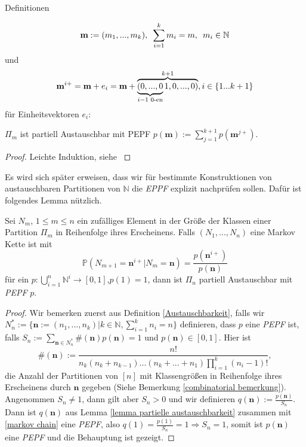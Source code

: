 \begin{section}{Definitionen}
\begin{lemma}
    \[
    \textbf{m} := (m_1,...,m_k), \hspace*{5pt} \sum_{i=1}^{k}m_i = m,\hspace*{5pt} m_i \in \mathbb{N} 
    \]
    und 
    \[ 
    \textbf{m}^{i+} = \textbf{m} + e_i =\textbf{m} + \overbrace{\underbrace{(0,...,0}_{i-1 \textnormal{ 0-en}}1,0,...,0)}^{k+1} , i \in \{1...k+1\}
    \]
     für Einheitsvektoren $e_i$:
\begin{center} 
    $\Pi_m$ ist partiell Austauschbar mit PEPF $p(\textbf{m}):=  \sum_{j=1}^{k+1} p(\textbf{m}^{j+})$.
\end{center}
\end{lemma}
\begin{proof}
    Leichte Induktion, siehe \cite[Proposition 10]{pitman1995exchangeable}
\end{proof}
\begin{Bemerkung}
    Es wird sich später erweisen, dass wir für bestimmte Konstruktionen von austauschbaren Partitionen von $\mathbb{N}$ die \textit{EPPF} explizit nachprüfen sollen. Dafür ist folgendes Lemma nützlich.
\end{Bemerkung}
\begin{lemma}
    \label{Austauschbar Lemma}
    Sei $N_m$, $1 \leq m \leq n$ ein zufälliges Element in der Größe der Klassen einer Partition $\Pi_m$ in Reihenfolge ihres Erscheinens. Falls $(N_1,...,N_n)$ eine Markov Kette ist mit 
    \begin{equation}
    \label{markov chain}
    \mathbb{P}(N_{m+1} = \textbf{n}^{i+} | N_{m} = \textbf{n}) = \frac{p(\textbf{n}^{i+})}{p(\textbf{n})} 
    \end{equation}
   für ein $p: \bigcup_{i = 1}^{n}\mathbb{N}^i \rightarrow [0,1]$,$p(1) = 1$, dann ist $\Pi_n$ partiell Austauschbar mit \textit{PEPF} $p$.
\end{lemma}
\begin{proof}
    Wir bemerken zuerst aus Definition \ref{Austauschbarkeit}, falls wir $N^*_n:= \{\textbf{n}:= (n_1,...,n_k)|k \in \mathbb{N},\sum_{i=1}^{k}n_i = n\}$ definieren, dass $p$ eine \textit{PEPF} ist, falls $S_n := \sum_{\textbf{n} \in N^*_n}\#(\textbf{n})p(\textbf{n}) = 1$ und $p(\textbf{n}) \in [0,1]$. Hier ist 
    \begin{equation}
        \label{combinatorial equation}
        \#(\textbf{n}):= \frac{n!}{n_k(n_k + n_{k-1})...(n_k+...+n_1)\prod_{i=1}^{k}(n_i-1)!},
    \end{equation}
    die Anzahl der Partitionen von $[n]$ mit Klassengrößen in Reihenfolge ihres Erscheinens durch $\textbf{n}$ gegeben (Siehe Bemerkung \ref{combinatorial bemerkung}). Angenommen $S_n \neq 1$, dann gilt aber $S_n> 0$ und wir definieren $q(\textbf{n}) := \frac{p(\textbf{n})}{S_n}$. Dann ist $q(\textbf{n})$ aus Lemma \ref{lemma partielle austauschbarkeit} zusammen mit \ref{markov chain} eine \textit{PEPF}, also $q(1) = \frac{p(1)}{S_n} = 1 \Rightarrow S_n =1$, somit ist $p(\textbf{n})$ eine \textit{PEPF} und die Behauptung ist gezeigt. 

\end{proof}
\end{section}
